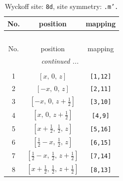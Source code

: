 \documentclass[fleqn,8pt]{jsarticle}
\begin{document}
\begin{longtable}{ccc}
\caption{Wyckoff site: {\tt 8d}, site symmetry: {\tt .m'.}}
 \\
 \hline \hline
No. & position & mapping \\ \hline \endfirsthead

\multicolumn{2}{l}{\tablename\ \thetable{}} \\
 \hline \hline
No. & position & mapping \\ \hline \endhead

 \hline \hline
\multicolumn{2}{r}{\footnotesize\it continued ...} \\ \endfoot

 \hline \hline
\multicolumn{2}{r}{} \\ \endlastfoot

1 & $\left[ x,\, 0,\, z \right]$ & {\tt [1,12]} \\ \hline
2 & $\left[ - x,\, 0,\, z \right]$ & {\tt [2,11]} \\ \hline
3 & $\left[ - x,\, 0,\, z + \frac{1}{2} \right]$ & {\tt [3,10]} \\ \hline
4 & $\left[ x,\, 0,\, z + \frac{1}{2} \right]$ & {\tt [4,9]} \\ \hline
5 & $\left[ x + \frac{1}{2},\, \frac{1}{2},\, z \right]$ & {\tt [5,16]} \\ \hline
6 & $\left[ \frac{1}{2} - x,\, \frac{1}{2},\, z \right]$ & {\tt [6,15]} \\ \hline
7 & $\left[ \frac{1}{2} - x,\, \frac{1}{2},\, z + \frac{1}{2} \right]$ & {\tt [7,14]} \\ \hline
8 & $\left[ x + \frac{1}{2},\, \frac{1}{2},\, z + \frac{1}{2} \right]$ & {\tt [8,13]} \\
\end{longtable}
\renewcommand{\arraystretch}{1.2}
\end{document}
